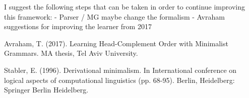 \documentclass{article}
\begin{document}
I suggest the following steps that can be taken in order to continue improving this framework:
- Parser / MG maybe change the formalism
- Avraham suggestions for improving the learner from 2017 %


\clearpage
\fancyhead{} %

\begin{thebibliography}{} %

Avraham, T. (2017). 
Learning Head-Complement Order with Minimalist Grammars.
MA thesis, Tel Aviv University.


Stabler, E. (1996). 
Derivational minimalism. In International conference on logical aspects of computational linguistics (pp. 68-95). 
Berlin, Heidelberg: Springer Berlin Heidelberg.


\end{thebibliography}
\end{document}
